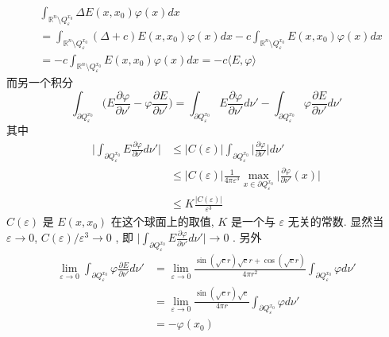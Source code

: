 \documentclass[a4paper, UTF8]{ctexart}				%
\begin{document}
        \[
            \begin{split}
                & \int^{}_{\mathbb{R}^n \setminus Q^{x_0}_\varepsilon} \Delta E(x,x_0) \varphi(x) dx\\
                & = \int^{}_{\mathbb{R}^n \setminus Q^{x_0}_\varepsilon} (\Delta + c) E(x,x_0) \varphi(x) dx - c \int^{}_{\mathbb{R}^n \setminus Q^{x_0}_\varepsilon} E(x,x_0) \varphi(x) dx\\
                & = - c \int^{}_{\mathbb{R}^n \setminus Q^{x_0}_\varepsilon} E(x,x_0) \varphi(x) dx = -c \langle{E},{\varphi}\rangle
            \end{split}
        \]
        而另一个积分 
        \[
            \int^{}_{\partial Q^{x_0}_\varepsilon} \biggl(E \frac{\partial \varphi}{\partial \nu'} - \varphi \frac{\partial E}{\partial \nu'}\biggl) = \int^{}_{\partial Q^{x_0}_\varepsilon} E \frac{\partial \varphi}{\partial \nu'}d\nu' - \int^{}_{\partial Q^{x_0}_\varepsilon} \varphi \frac{\partial E}{\partial \nu'}d\nu' 
        \]
        其中 
        \[
            \begin{split}
                \Biggl\vert{\int^{}_{\partial Q^{x_0}_\varepsilon} E \frac{\partial \varphi}{\partial \nu'}d\nu'}\Biggl\vert 
                & \le \vert C(\varepsilon) \vert \int^{}_{\partial Q^{x_0}_\varepsilon} \bigg\vert \frac{\partial \varphi}{\partial \nu'}\bigg\vert d\nu'\\
                & \le \vert C(\varepsilon) \vert \frac{1}{4 \pi \varepsilon^3} \max_{x \in \partial Q^{x_0}_\varepsilon} \bigg\vert \frac{\partial \varphi}{\partial \nu'}(x)\bigg\vert\\
                & \le K \frac{\vert C(\varepsilon)\vert }{\varepsilon^3}
            \end{split}
        \]
        $C(\varepsilon)$ 是 $E(x, x_0)$ 在这个球面上的取值, $K$ 是一个与 $\varepsilon$ 无关的常数. 显然当 $\varepsilon \rightarrow 0 $, $C(\varepsilon)/\varepsilon^3 \rightarrow 0$ , 即 $\big\vert{\int^{}_{\partial Q^{x_0}_\varepsilon} E \frac{\partial \varphi}{\partial \nu'}d\nu'}\big\vert \rightarrow 0$ . 另外 
        \[
            \begin{split}
                \lim_{\varepsilon \rightarrow 0} \int^{}_{\partial Q^{x_0}_\varepsilon} \varphi \frac{\partial E}{\partial \nu'}d\nu' 
                & = \lim_{\varepsilon \rightarrow 0} \frac{\sin (\sqrt{c}r)\sqrt{c}r + \cos (\sqrt{c}r)}{4 \pi r^2} \int^{}_{\partial Q^{x_0}_\varepsilon} \varphi d\nu'\\
                & = \lim_{\varepsilon \rightarrow 0} \frac{\sin (\sqrt{c}r)\sqrt{c}}{4 \pi r} \int^{}_{\partial Q^{x_0}_\varepsilon} \varphi d\nu'\\
                & =  -\varphi(x_0)
            \end{split}
        \]
\end{document}
